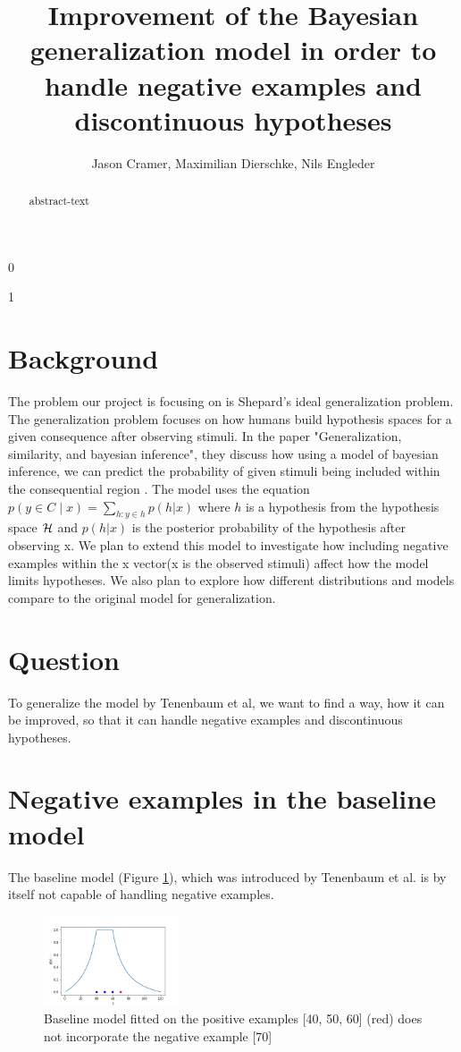 \documentclass[12pt, ]{scrartcl}
\title{Improvement of the Bayesian generalization model in order to handle negative examples and discontinuous hypotheses}
\begin{document}
\def\isblind{1}
\if\isblind0
    \author{Jason Cramer, Maximilian Dierschke, Nils Engleder}\fi
\if \isblind1
    \author{}\fi

\maketitle
\begin{abstract}
	abstract-text
\end{abstract}
\doublespacing
\begin{multicols}{2}
\section{Background}
The problem our project is focusing on is Shepard's ideal generalization problem. The generalization problem focuses on how humans build hypothesis spaces for a given consequence after observing stimuli.
In the paper "Generalization, similarity, and bayesian inference", they discuss how using a model of bayesian inference, we can predict the probability of given stimuli being included within the consequential region \cite{Tenenbaum}.
The model uses the equation $p(y \in C \mid x) = \sum\limits_{h:y\in h} p(h | x)$ where $h$ is a hypothesis from the hypothesis space ${\cal H}$ and $p(h | x)$ is the posterior probability of  the hypothesis after observing x.
We plan to extend this model to investigate how including negative examples within the x vector(x is the observed stimuli) affect how the model limits hypotheses. We also plan to explore how different distributions and models compare to the original model for generalization.
\section{Question}
To generalize the model by Tenenbaum et al, we want to find a way, how it can be improved, so that it can handle negative examples and discontinuous hypotheses.

\section{Negative examples in the baseline model}
The baseline model (Figure \ref{fig:baseline}), which was introduced by Tenenbaum et al. is by itself not capable of handling negative examples.

\begin{figure}[t]
	\includegraphics[width=4cm]{graphics/baseline.png}
	\centering
	\caption{Baseline model fitted on the positive examples [40, 50, 60] (red) does not incorporate the negative example [70] }
	\label{fig:baseline}
\end{figure}


\end{multicols}
\end{document}
